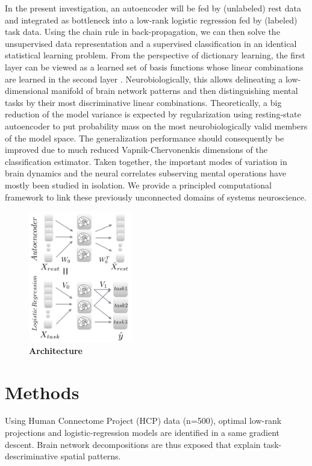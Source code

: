 \documentclass{article} %
\begin{document}
\linebreak

In the present investigation,
an autoencoder will be fed by (unlabeled) rest data and
integrated as bottleneck
into a low-rank logistic regression fed by (labeled) task data.
Using the chain rule in back-propagation, we can then
solve the unsupervised data representation and a supervised classification
in an identical statistical learning problem.
%
From the perspective of dictionary learning, the first layer can be
viewed as a learned set of basis functions
whose linear combinations are learned
in the second layer \cite{olshausen96}.
%
Neurobiologically, this allows 
delineating a low-dimensional manifold of brain network patterns and then 
distinguishing mental tasks
by their most discriminative linear combinations.
%
Theoretically, a big reduction of the model variance is expected by
regularization using resting-state autoencoder
to put probability mass on the most neurobiologically
valid members of the model space.
%
The generalization performance should consequently be improved due to 
much reduced Vapnik-Chervonenkis dimensions of the classification estimator.
%
Taken together,
the important modes of variation in brain dynamics and
the neural correlates subserving mental operations
have mostly been studied in isolation.
We provide a principled computational framework to link these previously
unconnected domains of systems neuroscience.

\begin{figure}
  \begin{center}
    \includegraphics[width=0.40\textwidth]{figures/figure1.png}
  \end{center}
  \caption {\textbf{Architecture}
  }
\end{figure}

%
\section{Methods}
%
Using
Human Connectome Project (HCP) data (n=500), optimal low-rank projections and
logistic-regression models are identified in a same gradient descent. Brain
network decompositions are thus exposed that explain task-descriminative spatial
patterns.
\end{document}
